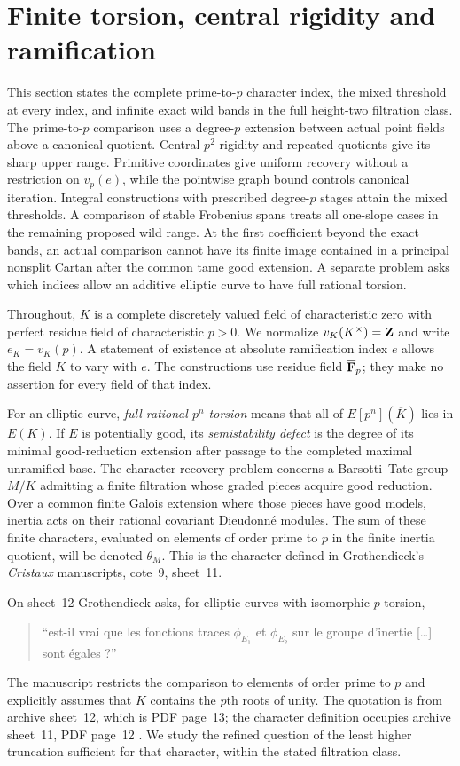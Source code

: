 \section{Finite torsion, central rigidity and ramification}
This section states the complete prime-to-$p$ character index, the mixed threshold at every index, and infinite exact wild bands in the full height-two filtration class. The prime-to-$p$ comparison uses a degree-$p$ extension between actual point fields above a canonical quotient. Central $p^2$ rigidity and repeated quotients give its sharp upper range. Primitive coordinates give uniform recovery without a restriction on $v_p(e)$, while the pointwise graph bound controls canonical iteration. Integral constructions with prescribed degree-$p$ stages attain the mixed thresholds. A comparison of stable Frobenius spans treats all one-slope cases in the remaining proposed wild range. At the first coefficient beyond the exact bands, an actual comparison cannot have its finite image contained in a principal nonsplit Cartan after the common tame good extension. A separate problem asks which indices allow an additive elliptic curve to have full rational torsion.

Throughout, $K$ is a complete discretely valued field of characteristic zero with perfect residue field of characteristic $p>0$. We normalize $v_K(K^\times)=\mathbf Z$ and write $e_K=v_K(p)$. A statement of existence at absolute ramification index $e$ allows the field $K$ to vary with $e$. The constructions use residue field $\overline{\mathbf F}_p$; they make no assertion for every field of that index.

For an elliptic curve, \emph{full rational $p^n$-torsion} means that all of $E[p^n](\overline K)$ lies in $E(K)$. If $E$ is potentially good, its \emph{semistability defect} is the degree of its minimal good-reduction extension after passage to the completed maximal unramified base. The character-recovery problem concerns a Barsotti--Tate group $M/K$ admitting a finite filtration whose graded pieces acquire good reduction. Over a common finite Galois extension where those pieces have good models, inertia acts on their rational covariant Dieudonn\'e modules. The sum of these finite characters, evaluated on elements of order prime to $p$ in the finite inertia quotient, will be denoted $\theta_M$. This is the character defined in Grothendieck's \emph{Cristaux} manuscripts, cote~9, sheet~11.

On sheet~12 Grothendieck asks, for elliptic curves with isomorphic $p$-torsion,
\begin{quote}
``est-il vrai que les fonctions traces $\phi_{E_1}$ et $\phi_{E_2}$ sur le groupe d'inertie [\ldots] sont \'egales ?''
\end{quote}
The manuscript restricts the comparison to elements of order prime to $p$ and explicitly assumes that $K$ contains the $p$th roots of unity. The quotation is from archive sheet~12, which is PDF page~13; the character definition occupies archive sheet~11, PDF page~12 \citep[pp.~11--13]{Grothendieck1969}. We study the refined question of the least higher truncation sufficient for that character, within the stated filtration class.

